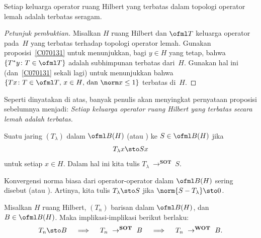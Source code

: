 \begin{prop} Setiap keluarga operator ruang Hilbert yang terbatas dalam topologi operator
lemah adalah terbatas seragam.
\end{prop}

\begin{proof}[\emph{Petunjuk pembuktian}] Misalkan $H$ ruang Hilbert dan $\ofml T$ keluarga operator pada~$H$
yang terbatas terhadap topologi operator lemah. Gunakan proposisi~\ref{C070131} untuk menunjukkan, bagi
$y \in H$ yang tetap, bahwa $\{T^*y\colon T \in \ofml T\}$ adalah subhimpunan terbatas dari~$H$. Gunakan hal ini (dan~\ref{C070131}
sekali lagi) untuk menunjukkan bahwa $\{Tx\colon \text{$T \in \ofml T$, $x \in H$, dan $\norm x \le 1$}\}$ terbatas di~$H$. \ns
\end{proof}

Seperti dinyatakan di atas, banyak penulis akan menyingkat pernyataan proposisi sebelumnya menjadi:
\emph{Setiap keluarga operator ruang Hilbert yang terbatas secara lemah adalah terbatas.}

\begin{defn}
Suatu jaring $(T_\lambda)$ dalam $\ofml B(H)$
 (atau ) ke $S \in \ofml B(H)$ jika
  \[ T_\lambda x \sto Sx \]
untuk setiap $x \in H$. Dalam hal ini kita tulis $T_\lambda~\to^{\textbf{SOT}}~S$.

Konvergensi norma biasa dari operator-operator dalam $\ofml B(H)$ sering disebut
 (atau ). Artinya, kita tulis
$T_\lambda \sto S$ jika $\norm{S - T_\lambda}\sto 0$.
\end{defn}

\begin{prop} Misalkan $H$ ruang Hilbert, $(T_n)$ barisan dalam $\ofml B(H)$,
dan $B \in \ofml B(H)$. Maka implikasi-implikasi berikut berlaku:
   \[ T_n \sto B \quad \implies \quad T_n~\to^{\textbf{SOT}}~B
                                \quad \implies \quad T_n~\to^{\textbf{WOT}}~B. \]
\end{prop}

